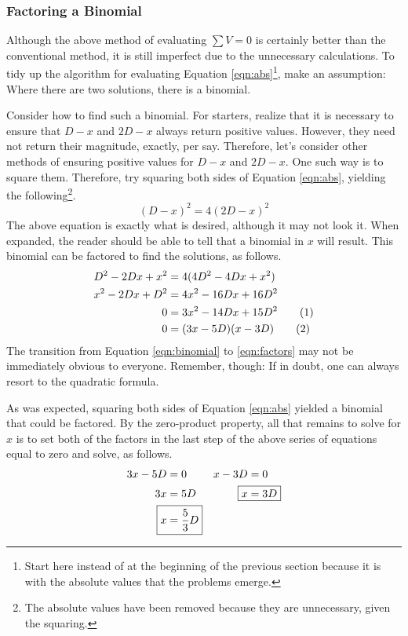 \documentclass[titlepage]{article}
\begin{document}
\subsubsection*{Factoring a Binomial}
Although the above method of evaluating $\sum V = 0$ is certainly better than the conventional method, it is still imperfect due to the unnecessary calculations. To tidy up the algorithm for evaluating Equation \ref{eqn:abs}\footnote{Start here instead of at the beginning of the previous section because it is with the absolute values that the problems emerge.}, make an assumption: Where there are two solutions, there is a binomial.\par
Consider how to find such a binomial. For starters, realize that it is necessary to ensure that $D-x$ and $2D-x$ always return positive values. However, they need not return their magnitude, exactly, per say. Therefore, let's consider other methods of ensuring positive values for $D-x$ and $2D-x$. One such way is to square them. Therefore, try squaring both sides of Equation \ref{eqn:abs}, yielding the following\footnote{The absolute values have been removed because they are unnecessary, given the squaring.}.
\begin{equation*}
    (D-x)^2=4(2D-x)^2
\end{equation*}
The above equation is exactly what is desired, although it may not look it. When expanded, the reader should be able to tell that a binomial in $x$ will result. This binomial can be factored to find the solutions, as follows.
\begin{align*}
    D^2-2Dx+x^2 &= 4(4D^2-4Dx+x^2)\\
    x^2-2Dx+D^2 &= 4x^2-16Dx+16D^2\\
    0 &= 3x^2-14Dx+15D^2\stepcounter{equation}\tag{\theequation}\label{eqn:binomial}\\
    0 &= (3x-5D)(x-3D)\stepcounter{equation}\tag{\theequation}\label{eqn:factors}
\end{align*}
The transition from Equation \ref{eqn:binomial} to \ref{eqn:factors} may not be immediately obvious to everyone. Remember, though: If in doubt, one can always resort to the quadratic formula.\par
As was expected, squaring both sides of Equation \ref{eqn:abs} yielded a binomial that could be factored. By the zero-product property, all that remains to solve for $x$ is to set both of the factors in the last step of the above series of equations equal to zero and solve, as follows.
\begin{align*}
    3x-5D &= 0&
        x-3D &= 0\\
    3x &= 5D&
        \Aboxed{x &= 3D}\\
    \Aboxed{x &= \frac{5}{3}D}
\end{align*}
\end{document}
